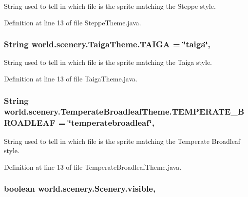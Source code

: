 String used to tell in which file is the sprite matching the Steppe style. 



Definition at line 13 of file Steppe\-Theme.\-java.

\hypertarget{a00028_ad3418d8f4936efb0ef1e3eb2009a34f0}{
\subsubsection[{T\-A\-I\-G\-A}]{\setlength{\rightskip}{0pt plus 5cm}String world.\-scenery.\-Taiga\-Theme.\-T\-A\-I\-G\-A = \char`\"{}taiga\char`\"{}\hspace{0.3cm}{\ttfamily [static]}, {\ttfamily [inherited]}}}\label{a00028_ad3418d8f4936efb0ef1e3eb2009a34f0}


String used to tell in which file is the sprite matching the Taiga style. 



Definition at line 13 of file Taiga\-Theme.\-java.

\hypertarget{a00030_a9e9253b684231327dd6ddeca5768033e}{
\subsubsection[{T\-E\-M\-P\-E\-R\-A\-T\-E\-\_\-\-B\-R\-O\-A\-D\-L\-E\-A\-F}]{\setlength{\rightskip}{0pt plus 5cm}String world.\-scenery.\-Temperate\-Broadleaf\-Theme.\-T\-E\-M\-P\-E\-R\-A\-T\-E\-\_\-\-B\-R\-O\-A\-D\-L\-E\-A\-F = \char`\"{}temperatebroadleaf\char`\"{}\hspace{0.3cm}{\ttfamily [static]}, {\ttfamily [inherited]}}}\label{a00030_a9e9253b684231327dd6ddeca5768033e}


String used to tell in which file is the sprite matching the Temperate Broadleaf style. 



Definition at line 13 of file Temperate\-Broadleaf\-Theme.\-java.

\hypertarget{a00024_a7b22a78d3126c947b7010fdbbea02218}{
\subsubsection[{visible}]{\setlength{\rightskip}{0pt plus 5cm}boolean world.\-scenery.\-Scenery.\-visible\hspace{0.3cm}{\ttfamily [protected]}, {\ttfamily [inherited]}}}\label{a00024_a7b22a78d3126c947b7010fdbbea02218}


